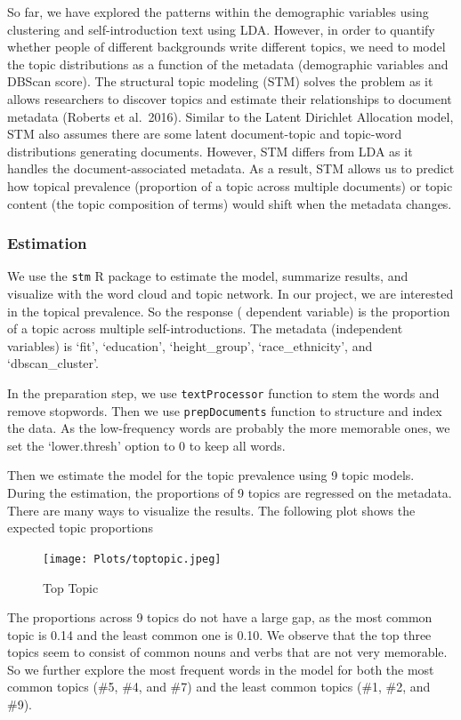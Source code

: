 \documentclass[]{article}
\begin{document}
So far, we have explored the patterns within the demographic variables
using clustering and self-introduction text using LDA. However, in order
to quantify whether people of different backgrounds write different
topics, we need to model the topic distributions as a function of the
metadata (demographic variables and DBScan score). The structural topic
modeling (STM) solves the problem as it allows researchers to discover
topics and estimate their relationships to document metadata (Roberts et
al.~2016). Similar to the Latent Dirichlet Allocation model, STM also
assumes there are some latent document-topic and topic-word
distributions generating documents. However, STM differs from LDA as it
handles the document-associated metadata. As a result, STM allows us to
predict how topical prevalence (proportion of a topic across multiple
documents) or topic content (the topic composition of terms) would shift
when the metadata changes.

\hypertarget{estimation}{%
\subsubsection{Estimation}\label{estimation}}

We use the \texttt{stm} R package to estimate the model, summarize
results, and visualize with the word cloud and topic network. In our
project, we are interested in the topical prevalence. So the response (
dependent variable) is the proportion of a topic across multiple
self-introductions. The metadata (independent variables) is `fit',
`education', `height\_group', `race\_ethnicity', and `dbscan\_cluster'.

In the preparation step, we use \texttt{textProcessor} function to stem
the words and remove stopwords. Then we use \texttt{prepDocuments}
function to structure and index the data. As the low-frequency words are
probably the more memorable ones, we set the `lower.thresh' option to 0
to keep all words.

Then we estimate the model for the topic prevalence using 9 topic
models. During the estimation, the proportions of 9 topics are regressed
on the metadata. There are many ways to visualize the results. The
following plot shows the expected topic proportions

\begin{figure}
\centering
\texttt{[image: Plots/toptopic.jpeg]}
\caption{Top Topic}
\end{figure}

The proportions across 9 topics do not have a large gap, as the most
common topic is 0.14 and the least common one is 0.10. We observe that
the top three topics seem to consist of common nouns and verbs that are
not very memorable. So we further explore the most frequent words in the
model for both the most common topics (\#5, \#4, and \#7) and the least
common topics (\#1, \#2, and \#9).
\end{document}
